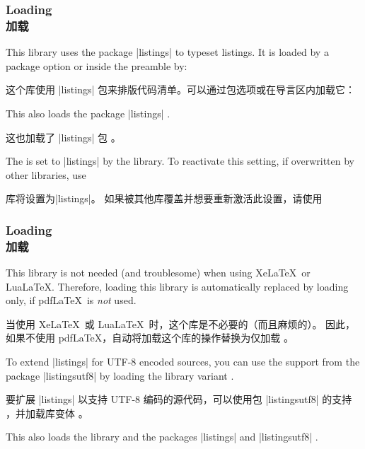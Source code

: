 \subsubsection{Loading \\加载 }

This library uses the package |listings| \cite{hoffmann:listings} to typeset
listings. It is loaded by a package option or inside the preamble by:

这个库使用 |listings| \cite{hoffmann:listings} 包来排版代码清单。可以通过包选项或在导言区内加载它：
\begin{dispListing}
\end{dispListing}
This also loads the package |listings| \cite{hoffmann:listings}.

这也加载了 |listings| 包 \cite{hoffmann:listings}。

The  is set to |listings| by the library.
To reactivate this setting, if overwritten by other libraries, use

库将设置为|listings|。 如果被其他库覆盖并想要重新激活此设置，请使用
\begin{dispListing}
\end{dispListing}

\subsubsection{Loading \\加载 }
\begin{marker}
This library is not needed (and troublesome) when using Xe\LaTeX\ or Lua\LaTeX.
Therefore, loading this library is automatically replaced by loading
 only, if pdf\LaTeX\ is \emph{not} used.

当使用 Xe\LaTeX\ 或 Lua\LaTeX\ 时，这个库是不必要的（而且麻烦的）。 因此，如果不使用 pdf\LaTeX，自动将加载这个库的操作替换为仅加载 。
\end{marker}
To extend |listings| for UTF-8 encoded sources, you can use the support from
the package |listingsutf8| \cite{oberdiek:listingsutf8} by loading the library
variant .

要扩展 |listings| 以支持 UTF-8 编码的源代码，可以使用包 |listingsutf8| 的支持 \cite{oberdiek:listingsutf8}，并加载库变体 。
\begin{dispListing}
\end{dispListing}
This also loads the library 
and the packages |listings| \cite{hoffmann:listings}
and |listingsutf8| \cite{oberdiek:listingsutf8}.

